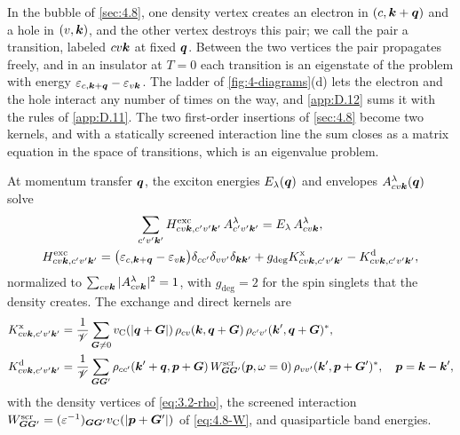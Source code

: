 In the bubble of \cref{sec:4.8}, one density vertex creates an electron in $(c,\bm{k}+\bm{q})$ and a hole in $(v,\bm{k})$, and the other vertex destroys this pair; we call the pair a transition, labeled $cv\bm{k}$ at fixed $\bm{q}$. Between the two vertices the pair propagates freely, and in an insulator at $T = 0$ each transition is an eigenstate of the problem with energy $\varepsilon_{c,\bm{k}+\bm{q}} - \varepsilon_{v\bm{k}}$. The ladder of \cref{fig:4-diagrams}(d) lets the electron and the hole interact any number of times on the way, and \cref{app:D.12} sums it with the rules of \cref{app:D.11}. The two first-order insertions of \cref{sec:4.8} become two kernels, and with a statically screened interaction line the sum closes as a matrix equation in the space of transitions, which is an eigenvalue problem.
\begin{keyresult}
At momentum transfer $\bm{q}$, the exciton energies $E_\lambda(\bm{q})$ and envelopes $A^\lambda_{cv\bm{k}}(\bm{q})$ solve
\begin{equation}
  \begin{gathered}
  \sum_{c'v'\bm{k}'}H^{\mathrm{exc}}_{cv\bm{k},c'v'\bm{k}'}\,A^\lambda_{c'v'\bm{k}'} = E_\lambda\,A^\lambda_{cv\bm{k}}, \\
  H^{\mathrm{exc}}_{cv\bm{k},c'v'\bm{k}'} = \bigl(\varepsilon_{c,\bm{k}+\bm{q}} - \varepsilon_{v\bm{k}}\bigr)\delta_{cc'}\delta_{vv'}\delta_{\bm{k}\bm{k}'} + g_{\mathrm{deg}}K^{\mathrm{x}}_{cv\bm{k},c'v'\bm{k}'} - K^{\mathrm{d}}_{cv\bm{k},c'v'\bm{k}'} ,
  \end{gathered}
  \label{eq:4.9-bse}
\end{equation}
normalized to $\sum_{cv\bm{k}}|A^\lambda_{cv\bm{k}}|^2 = 1$, with $g_{\mathrm{deg}} = 2$ for the spin singlets that the density creates. The exchange and direct kernels are
\begin{equation}
  \begin{aligned}
  K^{\mathrm{x}}_{cv\bm{k},c'v'\bm{k}'} &= \frac1{\mathscr{V}}\sum_{\bm{G}\ne0}v_{\mathrm{C}}(|\bm{q}+\bm{G}|)\,\rho_{cv}(\bm{k},\bm{q}+\bm{G})\,\rho_{c'v'}(\bm{k}',\bm{q}+\bm{G})^* ,\\
  K^{\mathrm{d}}_{cv\bm{k},c'v'\bm{k}'} &= \frac1{\mathscr{V}}\sum_{\bm{G}\bm{G}'}\rho_{cc'}(\bm{k}'+\bm{q},\bm{p}+\bm{G})\,W^{\mathrm{scr}}_{\bm{G}\bm{G}'}(\bm{p},\omega = 0)\,\rho_{vv'}(\bm{k}',\bm{p}+\bm{G}')^*, \quad \bm{p} = \bm{k} - \bm{k}' ,
  \end{aligned}
  \label{eq:4.9-kernels}
\end{equation}
with the density vertices of \cref{eq:3.2-rho}, the screened interaction $W^{\mathrm{scr}}_{\bm{G}\bm{G}'} = (\varepsilon^{-1})_{\bm{G}\bm{G}'}v_{\mathrm{C}}(|\bm{p}+\bm{G}'|)$ of \cref{eq:4.8-W}, and quasiparticle band energies.
\end{keyresult}
